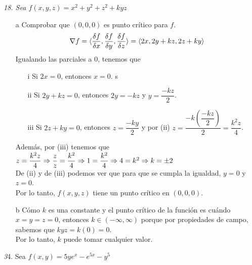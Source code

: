 \documentclass[a4paper,12pt]{article}
\begin{document}
\textit{18. Sea $f(x,y,z) = x^2 + y^2 + z^2 + kyz$}
\begin{itemize}
	\item[a] Comprobar que $(0,0,0)$ es punto crítico para $f$.
	$$\nabla f = \langle \dfrac{\delta f}{\delta x}, \dfrac{\delta f}{\delta y}, \dfrac{\delta f}{\delta z}\rangle = \langle 2x, 2y + kz, 2z +ky \rangle$$
	Igualando las parciales a $0$, tenemos que
	\begin{itemize}
		\item[i] Si $2x = 0$, entonces $x = 0$.
	s	\item[ii] Si $2y + kz = 0$, entonces $2y = -kz$ y $y = \dfrac{-kz}{2}$.
		\item[iii] Si $2z + ky = 0$, entonces $z = \dfrac{-ky}{2}$ y por (ii) $z = \dfrac{-k (\dfrac{-kz}{2})}{2} = \dfrac{k^2z}{4}$.
	\end{itemize}
	Además, por (iii) tenemos que $z = \dfrac{k^2z}{4} \Rightarrow \dfrac{z}{z} = \dfrac{k^2}{4} \Rightarrow 1 = \dfrac{k^2}{4} \\ \Rightarrow 4 = k^2 \Rightarrow k = \pm 2$\\
	De (ii) y de (iii) podemos ver que para que se cumpla la igualdad, $y = 0$ y $z = 0$.\\
	Por lo tanto, $f(x,y,z)$ tiene un punto crítico en  $(0,0,0)$.
	\item[b] Cómo $k$ es una constante y el punto crítico de la función es cuándo $x = y = z = 0$, entonces $k \in (-\infty, \infty)$ porque por propiedades de campo, sabemos que $kyz = k(0) = 0$.\\
	Por lo tanto, $k$ puede tomar cualquier valor.\\
\end{itemize}		
\textit 34. Sea $f(x,y) = 5ye^x - e^{5x} -y^5$
\end{document}

